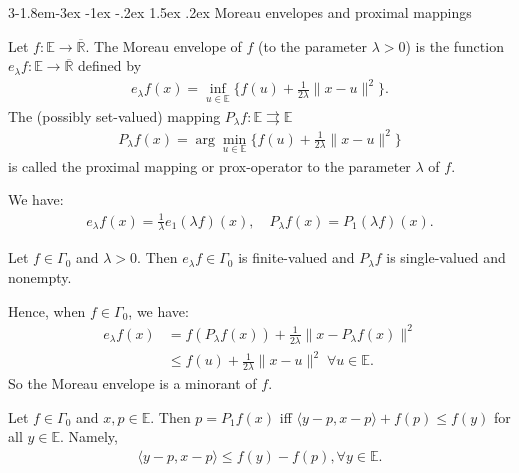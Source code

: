 \documentclass{tufte-handout}
\makeatletter
\renewcommand{\subsection}{\@startsection{subsection}%
    {3}{-1.8em}{-3ex \@plus -1ex \@minus -.2ex}%
    {1.5ex \@plus .2ex}
    {\hspace*{-5.5em}\fcolorbox{ltblue}{ltblue}{\parbox[c][1.0ex][b]{4em}{\phantom{space}}}
    \normalfont\large\itshape\color{ltblue}}}
\makeatother
\begin{document}
\subsection{Moreau envelopes and proximal mappings}
\begin{Definition}
    Let \( f:\mathbb{E}\to \overline{\mathbb{R}}\). The Moreau envelope of \( f \) 
    (to the parameter \( \lambda > 0 \)) is the function \(e_\lambda f:\mathbb{E}\to \overline{\mathbb{R}} \) defined by
    \begin{align}
    e_\lambda f(x) = \inf_{u \in \mathbb{E}} \{ f(u) + \frac{1}{2\lambda} \|x - u\|^2 \}.
    \end{align}
    The (possibly set-valued) mapping \( P_\lambda f: \mathbb{E} \rightrightarrows \mathbb{E} \) 
    \begin{align}
    P_\lambda f(x) = \arg\min_{u \in \mathbb{E}} \{ f(u) + \frac{1}{2\lambda} \|x - u\|^2 \}
    \end{align}
    is called the proximal mapping or prox-operator to the parameter \( \lambda \) of \( f \).
\end{Definition}

\begin{Proposition}
    We have:
    \begin{align}
        e_\lambda f(x) = \frac{1}{\lambda} e_1 (\lambda f)(x), \quad P_\lambda f(x) = P_1 (\lambda f)(x).
    \end{align}
\end{Proposition}

\begin{Proposition}
    Let \( f \in \Gamma_0\) and \( \lambda > 0 \). Then \( e_\lambda f \in \Gamma_0 \) 
    is finite-valued and \( P_\lambda f \) is single-valued and nonempty.
\end{Proposition}
Hence, when \( f \in \Gamma_0 \), we have:
\begin{align}
    e_\lambda f(x) &= f(P_\lambda f(x)) + \frac{1}{2\lambda} \|x - P_\lambda f(x)\|^2\\
    &\leq f(u) + \frac{1}{2\lambda} \|x - u\|^2 \; \forall u \in \mathbb{E}.
\end{align}
So the Moreau envelope is a minorant of \( f \).
\begin{Proposition}
    \label{prop:prox_ineq}
    Let \( f \in \Gamma_0 \) and \( x,p \in \mathbb{E} \). Then \( p = P_1f(x)  \) 
    iff \( \langle y-p, x-p \rangle + f(p) \leq f(y) 
     \) for all \( y \in \mathbb{E} \). Namely,
    \begin{align}
        \langle y-p, x-p \rangle \leq f(y) - f(p), \forall y \in \mathbb{E}.
    \end{align}
\end{Proposition}
\end{document}
